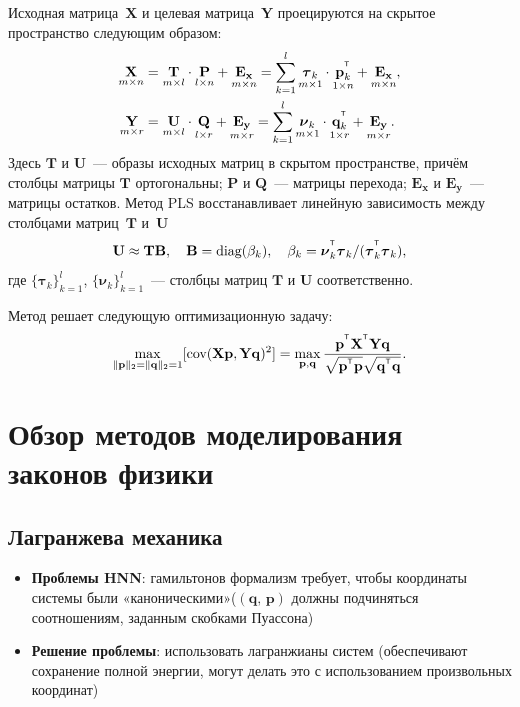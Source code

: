 \documentclass[12pt]{article}
\newcommand{\bx}{\mathbf{x}}
\newcommand{\by}{\mathbf{y}}
\newcommand{\bY}{\mathbf{Y}}
\newcommand{\bX}{\mathbf{X}}
\newcommand{\bp}{\mathbf{p}}
\newcommand{\bq}{\mathbf{q}}
\newcommand{\bP}{\mathbf{P}}
\newcommand{\bT}{\mathbf{T}}
\newcommand{\bB}{\mathbf{B}}
\newcommand{\bQ}{\mathbf{Q}}
\newcommand{\bE}{\mathbf{E}}
\newcommand{\bU}{\mathbf{U}}
\newcommand{\bnu}{\boldsymbol{\nu}}
\newcommand{\btau}{\boldsymbol{\tau}}
\newcommand{\T}{^{\text{\tiny\sffamily\upshape\mdseries T}}}
\begin{document}
	Исходная матрица~$\bX$ и целевая матрица~$\bY$ проецируются на скрытое пространство следующим образом:
	\begin{align}
	\label{ch1:eq:PLS_X}
	\underset{m \times n}{\bX} 
	&= \underset{m \times l}{\bT} \cdot \underset{l \times n}{\bP} + \underset{m \times n}{\bE_{\bx}} 
	= \sum_{k=1}^l \underset{m \times 1}{\btau_k} \cdot \underset{1 \times n}{\bp_k^{\T}} + \underset{m \times n}{\bE_{\bx}},\\
	\label{ch1:eq:PLS_Y}
	\underset{m \times r}{\bY} 
	&= \underset{m \times l}{\bU} \cdot \underset{l \times r}{\bQ} + \underset{m \times r}{\bE_{\by}}
	=  \sum_{k=1}^l  \underset{m \times 1}{\bnu_k} \cdot \underset{1 \times r}{\bq_k^{\T}} +  \underset{m \times r}{\bE_{\by}}.
	\end{align}
	Здесь $\bT$ и $\bU$~--- образы исходных матриц в скрытом пространстве, причём столбцы матрицы $\bT$ ортогональны; $\bP$ и $\bQ$~--- матрицы перехода; $\bE_{\bx}$ и $\bE_{\by}$~--- матрицы остатков. 
	Метод PLS восстанавливает линейную зависимость между столбцами матриц~$\bT$ и~$\bU$
	\begin{equation*}
	\bU \approx \bT \bB, \quad \bB = \text{diag}(\beta_k), \quad \beta_k = \bnu_k^{\T}\btau_k / (\btau_k^{\T}\btau_k),
	\end{equation*}
	где $\{\btau_k\}_{k=1}^l$, $\{\bnu_k\}_{k=1}^l$~--- столбцы матриц $\bT$ и $\bU$ соответственно.
	
	Метод решает следующую оптимизационную задачу:
	\begin{equation}
	\max_{\|\bp\|_{2}=\|\bq\|_{2}=1}[ \text{cov}(\bX \bp, \bY \bq)^{2}] = \max_{\bp, \bq} \frac{\bp^{\T} \bX^{\T} \bY \bq}{\sqrt{\bp^{\T} \bp} \sqrt{\bq^{\T} \bq}}.
	\label{ch1:eq:pls_max_cov}
	\end{equation}
	
	
	\section{Обзор методов моделирования законов физики}
	\subsection{Лагранжева механика}
	\begin{itemize}
		\item \textbf{Проблемы HNN}: гамильтонов формализм требует, чтобы координаты системы были «каноническими»($(\textbf{q, p})$ должны подчиняться соотношениям, заданным скобками Пуассона) %
		\item \textbf{Решение проблемы}: использовать лагранжианы систем (обеспечивают сохранение полной энергии, могут делать это с использованием произвольных координат)
	\end{itemize}
	
\end{document}

